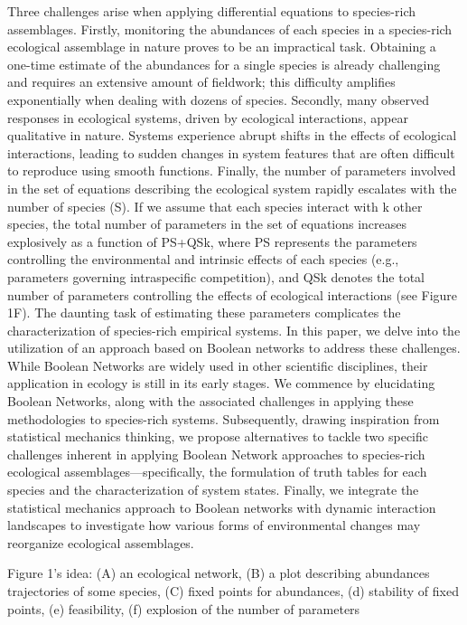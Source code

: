 	Three challenges arise when applying differential equations to species-rich assemblages. Firstly, monitoring the abundances of each species in a species-rich ecological assemblage in nature proves to be an impractical task. Obtaining a one-time estimate of the abundances for a single species is already challenging and requires an extensive amount of fieldwork; this difficulty amplifies exponentially when dealing with dozens of species. Secondly, many observed responses in ecological systems, driven by ecological interactions, appear qualitative in nature. Systems experience abrupt shifts in the effects of ecological interactions, leading to sudden changes in system features that are often difficult to reproduce using smooth functions. Finally, the number of parameters involved in the set of equations describing the ecological system rapidly escalates with the number of species (S). If we assume that each species interact with k other species, the total number of parameters in the set of equations increases explosively as a function of PS+QSk, where PS represents the parameters controlling the environmental and intrinsic effects of each species (e.g., parameters governing intraspecific competition), and QSk denotes the total number of parameters controlling the effects of ecological interactions (see Figure 1F). The daunting task of estimating these parameters complicates the characterization of species-rich empirical systems. 
	In this paper, we delve into the utilization of an approach based on Boolean networks to address these challenges. While Boolean Networks are widely used in other scientific disciplines, their application in ecology is still in its early stages. We commence by elucidating Boolean Networks, along with the associated challenges in applying these methodologies to species-rich systems. Subsequently, drawing inspiration from statistical mechanics thinking, we propose alternatives to tackle two specific challenges inherent in applying Boolean Network approaches to species-rich ecological assemblages—specifically, the formulation of truth tables for each species and the characterization of system states. Finally, we integrate the statistical mechanics approach to Boolean networks with dynamic interaction landscapes to investigate how various forms of environmental changes may reorganize ecological assemblages.

Figure 1’s idea: (A) an ecological network, (B) a plot describing abundances trajectories of some species, (C) fixed points for abundances, (d) stability of fixed points, (e) feasibility, (f) explosion of the number of parameters



